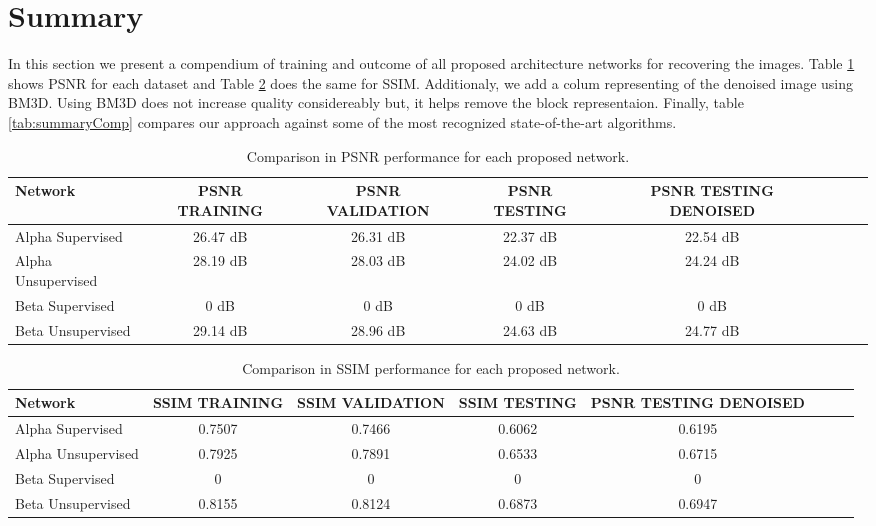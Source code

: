 \section{Summary}
In this section we present a compendium of training and outcome of all proposed architecture networks for recovering the images. Table \ref{tab:summaryPSNR} shows PSNR for each dataset and Table \ref{tab:summarySSIM} does the same for SSIM. Additionaly, we add a colum representing of the denoised image using BM3D\citep{dabov2007image}. Using BM3D does not increase quality considereably but, it helps remove the block representaion. Finally, table \ref{tab:summaryComp} compares our approach against some of the most recognized state-of-the-art algorithms.    
\begin{table}[tb]
\caption[Compendium of PSNR for reconstructing networks]{Comparison in PSNR performance for each proposed network.}
\label{tab:summaryPSNR}
\centering
\begin{tabular}{l*{6}{c}r}
Network              & PSNR TRAINING & PSNR VALIDATION & PSNR TESTING & PSNR TESTING DENOISED\\
\hline
Alpha Supervised   & 26.47 dB & 26.31 dB & 22.37 dB & 22.54 dB\\
Alpha Unsupervised     & 28.19 dB & 28.03 dB & 24.02 dB & 24.24 dB\\
Beta Supervised & 0 dB & 0 dB & 0 dB & 0 dB\\
Beta Unsupervised & 29.14 dB & 28.96 dB & 24.63 dB & 24.77 dB\\
\bottomrule 
\end{tabular}  
\end{table}

\begin{table}[tb]
\caption[Compendium of SSIM for reconstructing networks]{Comparison in SSIM performance for each proposed network.}
\label{tab:summarySSIM}
\centering
\begin{tabular}{l*{6}{c}r}
Network              & SSIM TRAINING & SSIM VALIDATION & SSIM TESTING & PSNR TESTING DENOISED\\
\hline
Alpha Supervised   & 0.7507 & 0.7466 & 0.6062 & 0.6195\\
Alpha Unsupervised     & 0.7925 & 0.7891 & 0.6533 & 0.6715\\
Beta Supervised & 0 & 0 & 0 & 0 \\
Beta Unsupervised & 0.8155 & 0.8124 & 0.6873 & 0.6947\\
\bottomrule 
\end{tabular}  
\end{table}

